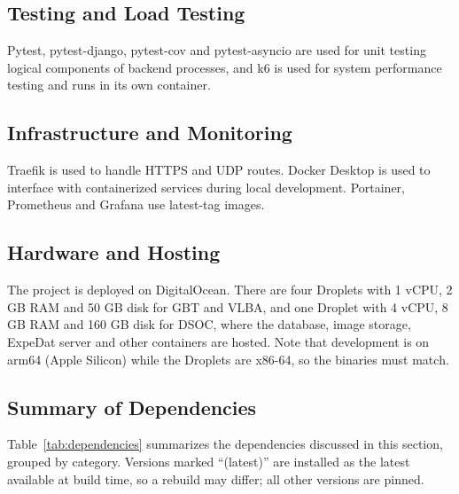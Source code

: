 \documentclass[12pt]{article}
\begin{document}
\subsection*{Testing and Load Testing}

  Pytest, pytest-django, pytest-cov and pytest-asyncio are used for unit testing logical components of backend processes, and k6 is used for system performance testing and runs in its own container.

\subsection*{Infrastructure and Monitoring}

  Traefik is used to handle HTTPS and UDP routes. Docker Desktop is used to interface with containerized services during local development. Portainer, Prometheus and Grafana use latest-tag images.

\subsection*{Hardware and Hosting}

  The project is deployed on DigitalOcean. There are four Droplets with 1 vCPU, 2 GB RAM and 50 GB disk for GBT and VLBA, and one Droplet with 4 vCPU, 8 GB RAM and 160 GB disk for DSOC, where the database, image storage, ExpeDat server and other containers are hosted. Note that development is on arm64 (Apple Silicon) while the Droplets are x86-64, so the binaries must match.

\subsection*{Summary of Dependencies}

  Table~\ref{tab:dependencies} summarizes the dependencies discussed in this section, grouped by category. Versions marked ``(latest)'' are installed as the latest available at build time, so a rebuild may differ; all other versions are pinned.
\end{document}
